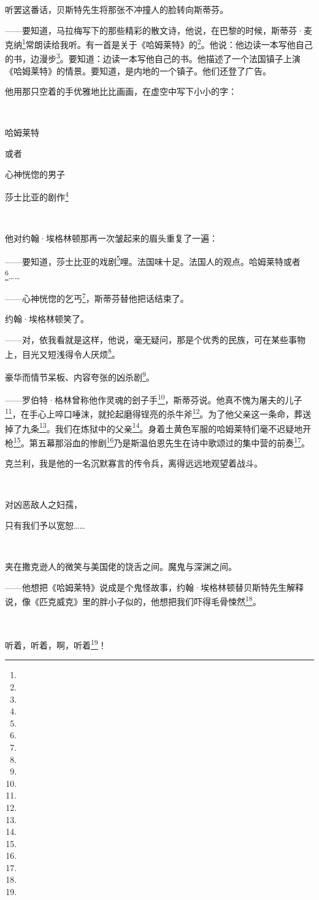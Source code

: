 \par 听罢这番话，贝斯特先生将那张不冲撞人的脸转向斯蒂芬。
\par ——要知道，马拉梅写下的那些精彩的散文诗，他说，在巴黎的时候，斯蒂芬·麦克纳\footnote{}常朗读给我听。有一首是关于《哈姆莱特》的\footnote{}。他说：他边读一本写他自己的书，边漫步\footnote{}。要知道：边读一本写他自己的书。他描述了一个法国镇子上演《哈姆莱特》的情景。要知道，是内地的一个镇子。他们还登了广告。
\par 他用那只空着的手优雅地比比画画，在虚空中写下小小的字：
\par  
\par 哈姆莱特
\par 或者
\par 心神恍惚的男子
\par 莎士比亚的剧作\footnote{}
\par  
\par 他对约翰·埃格林顿那再一次皱起来的眉头重复了一遍：
\par ——要知道，莎士比亚的戏剧\footnote{}哩。法国味十足。法国人的观点。哈姆莱特或者\footnote{}……
\par ——心神恍惚的乞丐\footnote{}，斯蒂芬替他把话结束了。
\par 约翰·埃格林顿笑了。
\par ——对，依我看就是这样，他说，毫无疑问，那是个优秀的民族，可在某些事物上，目光又短浅得令人厌烦\footnote{}。
\par 豪华而情节呆板、内容夸张的凶杀剧\footnote{}。
\par ——罗伯特·格林曾称他作灵魂的刽子手\footnote{}，斯蒂芬说。他真不愧为屠夫的儿子\footnote{}，在手心上啐口唾沫，就抡起磨得锃亮的杀牛斧\footnote{}。为了他父亲这一条命，葬送掉了九条\footnote{}。我们在炼狱中的父亲\footnote{}。身着土黄色军服的哈姆莱特们毫不迟疑地开枪\footnote{}。第五幕那浴血的惨剧\footnote{}乃是斯温伯恩先生在诗中歌颂过的集中营的前奏\footnote{}。
\par 克兰利，我是他的一名沉默寡言的传令兵，离得远远地观望着战斗。
\par  
\par 对凶恶敌人之妇孺，
\par 只有我们予以宽恕……
\par  
\par 夹在撒克逊人的微笑与美国佬的饶舌之间。魔鬼与深渊之间。
\par ——他想把《哈姆莱特》说成是个鬼怪故事，约翰·埃格林顿替贝斯特先生解释说，像《匹克威克》里的胖小子似的，他想把我们吓得毛骨悚然\footnote{}。
\par  
\par 听着，听着，啊，听着\footnote{}！
